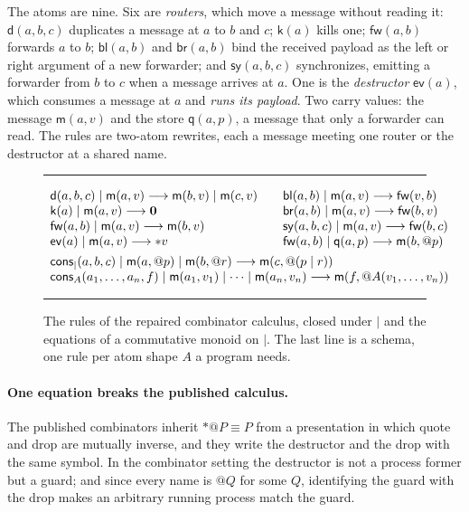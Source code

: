 The atoms are nine. Six are \emph{routers}, which move a message without reading it:
$\mathsf{d}(a,b,c)$ duplicates a message at $a$ to $b$ and $c$; $\mathsf{k}(a)$ kills
one; $\mathsf{fw}(a,b)$ forwards $a$ to $b$; $\mathsf{bl}(a,b)$ and $\mathsf{br}(a,b)$
bind the received payload as the left or right argument of a new forwarder; and
$\mathsf{sy}(a,b,c)$ synchronizes, emitting a forwarder from $b$ to $c$ when a message
arrives at $a$. One is the \emph{destructor} $\mathsf{ev}(a)$, which consumes a message at
$a$ and \emph{runs its payload}. Two carry values: the message $\mathsf{m}(a,v)$ and the
store $\mathsf{q}(a,p)$, a message that only a forwarder can read. The rules are two-atom
rewrites, each a message meeting one router or the destructor at a shared name.

\begin{figure}[t]
\hrule\vspace{4pt}
\[
\begin{array}{l@{\qquad}l}
 \mathsf{d}(a,b,c) \mid \mathsf{m}(a,v) \rewrite \mathsf{m}(b,v) \mid \mathsf{m}(c,v)
   & \mathsf{bl}(a,b) \mid \mathsf{m}(a,v) \rewrite \mathsf{fw}(v,b)\\
 \mathsf{k}(a) \mid \mathsf{m}(a,v) \rewrite \nil
   & \mathsf{br}(a,b) \mid \mathsf{m}(a,v) \rewrite \mathsf{fw}(b,v)\\
 \mathsf{fw}(a,b) \mid \mathsf{m}(a,v) \rewrite \mathsf{m}(b,v)
   & \mathsf{sy}(a,b,c) \mid \mathsf{m}(a,v) \rewrite \mathsf{fw}(b,c)\\
 \mathsf{ev}(a) \mid \mathsf{m}(a,v) \rewrite *v
   & \mathsf{fw}(a,b) \mid \mathsf{q}(a,p) \rewrite \mathsf{m}(b,@p)\\[4pt]
 \multicolumn{2}{l}{\mathsf{cons}_{\mid}(a,b,c) \mid \mathsf{m}(a,@p) \mid \mathsf{m}(b,@r)
   \rewrite \mathsf{m}(c,@(p \mid r))}\\
 \multicolumn{2}{l}{\mathsf{cons}_{A}(a_{1},\dots,a_{n},f) \mid \mathsf{m}(a_{1},v_{1})
   \mid \cdots \mid \mathsf{m}(a_{n},v_{n})
   \rewrite \mathsf{m}(f,@A(v_{1},\dots,v_{n}))}
\end{array}
\]
\vspace{2pt}\hrule
\caption{The rules of the repaired combinator calculus, closed under $\mid$ and the
equations of a commutative monoid on $\mid$. The last line is a schema, one rule per
atom shape $A$ a program needs.}
\label{cb:fig:rules}
\end{figure}

\paragraph{One equation breaks the published calculus.} The published combinators inherit
$*@P \equiv P$ from a presentation in which quote and drop are mutually inverse, and they
write the destructor and the drop with the same symbol. In the combinator setting the
destructor is not a process former but a guard; and since every name is $@Q$ for some $Q$,
identifying the guard with the drop makes an arbitrary running process match the guard.

